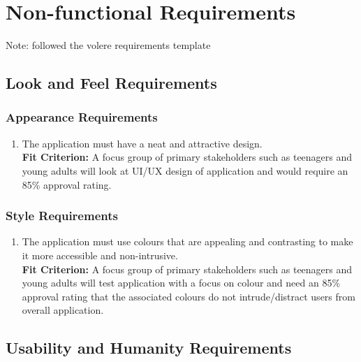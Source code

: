 \documentclass[12pt,letterpaper]{article}
\begin{document}
\section{Non-functional Requirements}
\noindent Note: followed the volere requirements template

\subsection{Look and Feel Requirements}
\subsubsection{Appearance Requirements}
\begin{enumerate}[{LF}1.] 
\item The application must have a neat and attractive design.\\
{\textbf{Fit Criterion:} A focus group of primary stakeholders such as teenagers and young adults will look at UI/UX design of application and would require an 85\% approval rating.}
\end{enumerate}

\subsubsection{Style Requirements}
\begin{enumerate}[resume*]  
\item The application must use colours that are appealing and contrasting to make it more accessible and non-intrusive.\\
{\textbf{Fit Criterion:} A focus group of primary stakeholders such as teenagers and young adults will test application with a focus on colour and need an 85\% approval rating that the associated colours do not intrude/distract users from overall application.}
\end{enumerate}

\subsection{Usability and Humanity Requirements}
\end{document}
